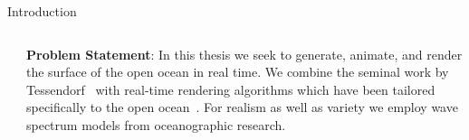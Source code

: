 \documentclass[final,hyperref={pdfpagelabels=true}]{beamer}
\begin{document}
\begin{frame}
\begin{center}
\begin{minipage}{0.99\textwidth}
\begin{block}{Introduction}
\begin{columns}[t]
\begin{column}{0.45\linewidth}
					
%				
				\end{column}
				\begin{column}{0.45\linewidth}
					\textbf{Problem Statement}:
					\nocite{course:simulatingocean,article:oceanlighting,article:whitecaps,thesis:johanson}
					In this thesis we seek to generate, animate, and render the surface of the
					open ocean in real time. We combine the seminal work by Tessendorf~\cite{course:simulatingocean}
					with real-time rendering algorithms which have been tailored specifically to
					the open ocean~\cite{article:oceanlighting,article:whitecaps,thesis:johanson}.
					For realism as well as variety we employ wave spectrum models from oceanographic research.

\end{column}
\end{columns}
\end{block}
\end{minipage}
\end{center}
\end{frame}
\end{document}
